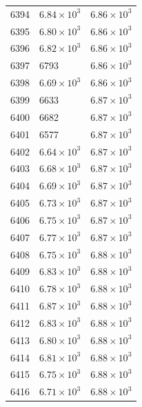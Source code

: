 \begin{table}[H]
\begin{tabular}{lll}
6394 & $\displaystyle 6.84 \times 10^{3}$ & $\displaystyle 6.86 \times 10^{3}$ \\
6395 & $\displaystyle 6.80 \times 10^{3}$ & $\displaystyle 6.86 \times 10^{3}$ \\
6396 & $\displaystyle 6.82 \times 10^{3}$ & $\displaystyle 6.86 \times 10^{3}$ \\
6397 & 6793 & $\displaystyle 6.86 \times 10^{3}$ \\
6398 & $\displaystyle 6.69 \times 10^{3}$ & $\displaystyle 6.86 \times 10^{3}$ \\
6399 & 6633 & $\displaystyle 6.87 \times 10^{3}$ \\
6400 & 6682 & $\displaystyle 6.87 \times 10^{3}$ \\
6401 & 6577 & $\displaystyle 6.87 \times 10^{3}$ \\
6402 & $\displaystyle 6.64 \times 10^{3}$ & $\displaystyle 6.87 \times 10^{3}$ \\
6403 & $\displaystyle 6.68 \times 10^{3}$ & $\displaystyle 6.87 \times 10^{3}$ \\
6404 & $\displaystyle 6.69 \times 10^{3}$ & $\displaystyle 6.87 \times 10^{3}$ \\
6405 & $\displaystyle 6.73 \times 10^{3}$ & $\displaystyle 6.87 \times 10^{3}$ \\
6406 & $\displaystyle 6.75 \times 10^{3}$ & $\displaystyle 6.87 \times 10^{3}$ \\
6407 & $\displaystyle 6.77 \times 10^{3}$ & $\displaystyle 6.87 \times 10^{3}$ \\
6408 & $\displaystyle 6.75 \times 10^{3}$ & $\displaystyle 6.88 \times 10^{3}$ \\
6409 & $\displaystyle 6.83 \times 10^{3}$ & $\displaystyle 6.88 \times 10^{3}$ \\
6410 & $\displaystyle 6.78 \times 10^{3}$ & $\displaystyle 6.88 \times 10^{3}$ \\
6411 & $\displaystyle 6.87 \times 10^{3}$ & $\displaystyle 6.88 \times 10^{3}$ \\
6412 & $\displaystyle 6.83 \times 10^{3}$ & $\displaystyle 6.88 \times 10^{3}$ \\
6413 & $\displaystyle 6.80 \times 10^{3}$ & $\displaystyle 6.88 \times 10^{3}$ \\
6414 & $\displaystyle 6.81 \times 10^{3}$ & $\displaystyle 6.88 \times 10^{3}$ \\
6415 & $\displaystyle 6.75 \times 10^{3}$ & $\displaystyle 6.88 \times 10^{3}$ \\
6416 & $\displaystyle 6.71 \times 10^{3}$ & $\displaystyle 6.88 \times 10^{3}$ \\

\end{tabular}
\end{table}
